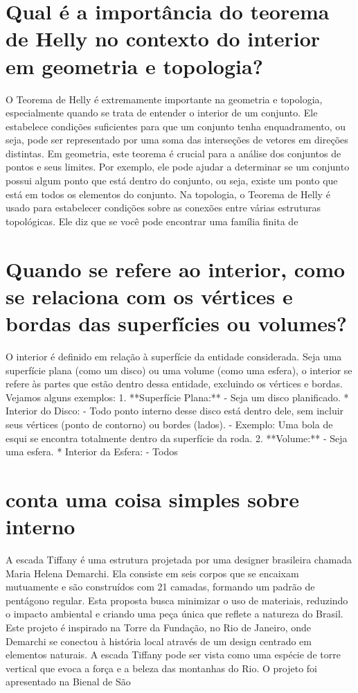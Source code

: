 \documentclass[11pt,a4paper]{article}
\begin{document}
\section{Qual é a importância do teorema de Helly no contexto do interior em geometria e topologia?}
O Teorema de Helly é extremamente importante na geometria e topologia, especialmente quando se trata de entender o interior de um conjunto. Ele estabelece condições suficientes para que um conjunto tenha enquadramento, ou seja, pode ser representado por uma soma das interseções de vetores em direções distintas. Em geometria, este teorema é crucial para a análise dos conjuntos de pontos e seus limites. Por exemplo, ele pode ajudar a determinar se um conjunto possui algum ponto que está dentro do conjunto, ou seja, existe um ponto que está em todos os elementos do conjunto. Na topologia, o Teorema de Helly é usado para estabelecer condições sobre as conexões entre várias estruturas topológicas. Ele diz que se você pode encontrar uma família finita de

\section{Quando se refere ao interior, como se relaciona com os vértices e bordas das superfícies ou volumes?}
O interior é definido em relação à superfície da entidade considerada. Seja uma superfície plana (como um disco) ou uma volume (como uma esfera), o interior se refere às partes que estão dentro dessa entidade, excluindo os vértices e bordas. Vejamos alguns exemplos: 1. **Superfície Plana:** - Seja um disco planificado. * Interior do Disco: - Todo ponto interno desse disco está dentro dele, sem incluir seus vértices (ponto de contorno) ou bordes (lados). - Exemplo: Uma bola de esqui se encontra totalmente dentro da superfície da roda. 2. **Volume:** - Seja uma esfera. * Interior da Esfera: - Todos

\section{conta uma coisa simples sobre interno}
A escada Tiffany é uma estrutura projetada por uma designer brasileira chamada Maria Helena Demarchi. Ela consiste em seis corpos que se encaixam mutuamente e são construídos com 21 camadas, formando um padrão de pentágono regular. Esta proposta busca minimizar o uso de materiais, reduzindo o impacto ambiental e criando uma peça única que reflete a natureza do Brasil. Este projeto é inspirado na Torre da Fundação, no Rio de Janeiro, onde Demarchi se conectou à história local através de um design centrado em elementos naturais. A escada Tiffany pode ser vista como uma espécie de torre vertical que evoca a força e a beleza das montanhas do Rio. O projeto foi apresentado na Bienal de São
\end{document}
